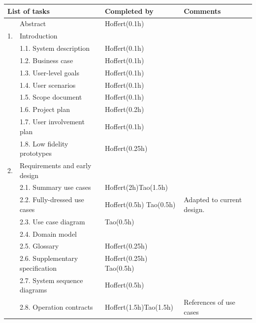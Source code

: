 \documentclass[12pt,a4paper]{article}
\begin{document}
\begin{longtable}{| p{0.2cm} p{6.25cm} | p{3cm}| p{5cm} |}
  \hline
  \multicolumn{2}{|l|}{\textbf{List of tasks}} & \textbf{Completed by} & \textbf{Comments} \\ \hline
   & Abstract & Hoffert(0.1h) &  \\ \hline
  1. & Introduction &  &  \\ \hline
   & 1.1. System description & Hoffert(0.1h) &  \\ \hline
   & 1.2. Business case & Hoffert(0.1h) &  \\ \hline
   & 1.3. User-level goals & Hoffert(0.1h) &  \\ \hline
   & 1.4. User scenarios & Hoffert(0.1h) &  \\ \hline
   & 1.5. Scope document & Hoffert(0.1h) &  \\ \hline
   & 1.6. Project plan & Hoffert(0.2h) &  \\ \hline
   & 1.7. User involvement plan & Hoffert(0.1h) &  \\ \hline
   & 1.8. Low fidelity prototypes & Hoffert(0.25h) &  \\ \hline
  2. & Requirements and early design &  &  \\ \hline
   & 2.1. Summary use cases & Hoffert(2h)\newline Tao(1.5h) &  \\ \hline
   & 2.2. Fully-dressed use cases & Hoffert(0.5h) \newline Tao(0.5h) & Adapted to current design. \\ \hline
   & 2.3. Use case diagram & Tao(0.5h) &  \\ \hline
   & 2.4. Domain model &  &  \\ \hline
   & 2.5. Glossary & Hoffert(0.25h) &  \\ \hline
   & 2.6. Supplementary specification & Hoffert(0.25h) \newline Tao(0.5h) &  \\ \hline
   & 2.7. System sequence diagrams & Hoffert(0.5h) &  \\ \hline
   & 2.8. Operation contracts & Hoffert(1.5h)\newline Tao(1.5h) & \newline References of use cases  \\ \hline

\end{longtable}
\end{document}
